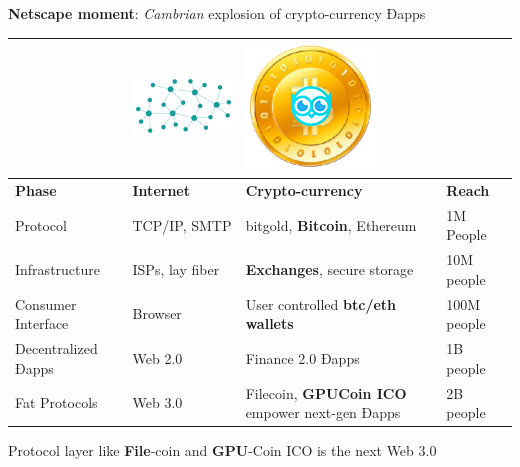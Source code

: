 \textbf{Netscape moment}: \emph{Cambrian} explosion of crypto-currency Ðapps
 

 \begin{adjustbox}{width=.75\textwidth}
\begin{tabularx} {\textwidth}{|X|X|X|X|}
 \hline
& \includegraphics[scale=0.2]{static/decentnew} & \includegraphics[scale=0.2]{static/hootcoin} & \\
 \hline
\textbf{Phase} & \textbf{Internet} & \textbf{Crypto-currency} & \textbf{Reach}\\
\hline
Protocol & TCP/IP, SMTP & bitgold, \textbf{Bitcoin}, Ethereum & 1M People \\
\hline
Infrastructure & ISPs, lay fiber & \textbf{Exchanges}, secure storage & 10M people \\
\hline
Consumer Interface & Browser & User controlled \textbf{btc/eth wallets} & 100M people \\
\hline
Decentralized Ðapps & Web 2.0 & Finance 2.0 Ðapps & 1B people\\
\hline
Fat Protocols & Web 3.0 & Filecoin, \textbf{GPUCoin ICO} empower next-gen Ðapps & 2B people\\

\hline
\end{tabularx}
\end{adjustbox}

Protocol layer like \textbf{File}-coin and \textbf{GPU}-Coin ICO is the next Web 3.0